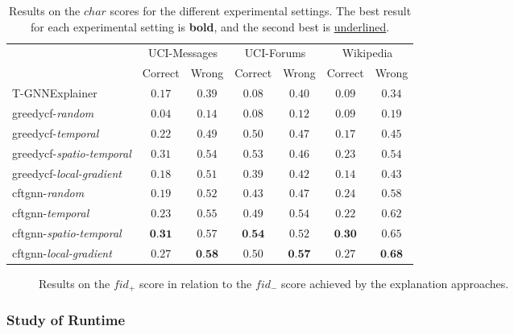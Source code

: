 \begin{table}[ht]
    \centering
    \small
    \begin{tabular}{lcccccc}
    \hline
         &  \multicolumn{2}{c}{UCI-Messages}&  \multicolumn{2}{c}{UCI-Forums}&  \multicolumn{2}{c}{Wikipedia}\\
         &  Correct&  Wrong&  Correct&  Wrong&  Correct& Wrong\\
         \hline
         T-GNNExplainer&  $0.17$&  $0.39$&  $0.08$&  $0.40$&  $0.09$& $0.34$\\
         \gls{greedycf}-\textit{random}&  $0.04$&  $0.14$&  $0.08$&  $0.12$&  $0.09$& $0.19$\\
         \gls{greedycf}-\textit{temporal}&  $0.22$&  $0.49$&  $0.50$&  $0.47$&  $0.17$& $0.45$\\
         \gls{greedycf}-\textit{spatio-temporal}&  \underline{$0.31$}&  $0.54$&  \underline{$0.53$}&  $0.46$&  $0.23$& $0.54$\\
         \gls{greedycf}-\textit{local-gradient}&  $0.18$&  $0.51$&  $0.39$&  $0.42$&  $0.14$& $0.43$\\
         \gls{cftgnn}-\textit{random}&  $0.19$&  $0.52$&  $0.43$&  $0.47$&  $0.24$& $0.58$\\
         \gls{cftgnn}-\textit{temporal}&  $0.23$&  $0.55$&  $0.49$&  \underline{$0.54$}&  $0.22$& $0.62$\\
         \gls{cftgnn}-\textit{spatio-temporal}&  $\textbf{0.31}$&  \underline{$0.57$}&  $\textbf{0.54}$&  $0.52$&  $\textbf{0.30}$& \underline{$0.65$}\\
 \gls{cftgnn}-\textit{local-gradient}& $0.27$& $\textbf{0.58}$& $0.50$& $\textbf{0.57}$& \underline{$0.27$}&$\textbf{0.68}$\\
 \hline
    \end{tabular}
    \caption{Results on the $char$ scores for the different experimental settings. The best result for each experimental setting is \textbf{bold}, and the second best is \underline{underlined}.}
    \label{t_char}
\end{table}


\begin{figure}[ht]
    \centering
    
    \caption{Results on the $fid_+$ score in relation to the $fid_-$ score achieved by the explanation approaches.}
    \label{f_fid_plus_minus}
\end{figure}


\FloatBarrier
\subsubsection{Study of Runtime}
\label{s_Evaluation_Results_Runtime}

